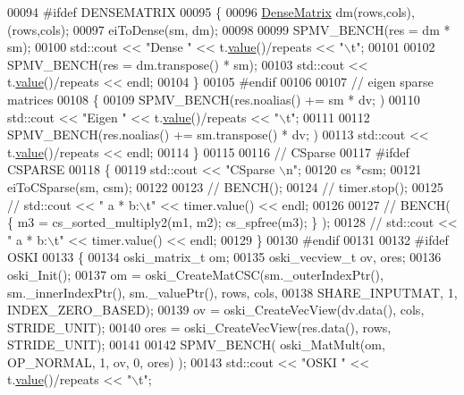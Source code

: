 \begin{DoxyCode}
00094 \textcolor{preprocessor}{    #ifdef DENSEMATRIX}
00095     \{
00096       \hyperlink{group___core___module}{DenseMatrix} dm(rows,cols), (rows,cols);
00097       eiToDense(sm, dm);
00098 
00099       SPMV\_BENCH(res = dm * sm);
00100       std::cout << \textcolor{stringliteral}{"Dense       "} << t.\hyperlink{class_eigen_1_1_bench_timer_a26760f963ed8b64c126159bfea57735e}{value}()/repeats << \textcolor{stringliteral}{"\(\backslash\)t"};
00101 
00102       SPMV\_BENCH(res = dm.transpose() * sm);
00103       std::cout << t.\hyperlink{class_eigen_1_1_bench_timer_a26760f963ed8b64c126159bfea57735e}{value}()/repeats << endl;
00104     \}
00105 \textcolor{preprocessor}{    #endif}
00106 
00107     \textcolor{comment}{// eigen sparse matrices}
00108     \{
00109       SPMV\_BENCH(res.noalias() += sm * dv; )
00110       std::cout << \textcolor{stringliteral}{"Eigen       "} << t.\hyperlink{class_eigen_1_1_bench_timer_a26760f963ed8b64c126159bfea57735e}{value}()/repeats << \textcolor{stringliteral}{"\(\backslash\)t"};
00111 
00112       SPMV\_BENCH(res.noalias() += sm.transpose() * dv; )
00113       std::cout << t.\hyperlink{class_eigen_1_1_bench_timer_a26760f963ed8b64c126159bfea57735e}{value}()/repeats << endl;
00114     \}
00115 
00116     \textcolor{comment}{// CSparse}
00117 \textcolor{preprocessor}{    #ifdef CSPARSE}
00118     \{
00119       std::cout << \textcolor{stringliteral}{"CSparse \(\backslash\)n"};
00120       cs *csm;
00121       eiToCSparse(sm, csm);
00122 
00123 \textcolor{comment}{//       BENCH();}
00124 \textcolor{comment}{//       timer.stop();}
00125 \textcolor{comment}{//       std::cout << "   a * b:\(\backslash\)t" << timer.value() << endl;}
00126 
00127 \textcolor{comment}{//       BENCH( \{ m3 = cs\_sorted\_multiply2(m1, m2); cs\_spfree(m3); \} );}
00128 \textcolor{comment}{//       std::cout << "   a * b:\(\backslash\)t" << timer.value() << endl;}
00129     \}
00130 \textcolor{preprocessor}{    #endif}
00131 
00132 \textcolor{preprocessor}{    #ifdef OSKI}
00133     \{
00134       oski\_matrix\_t om;
00135       oski\_vecview\_t ov, ores;
00136       oski\_Init();
00137       om = oski\_CreateMatCSC(sm.\_outerIndexPtr(), sm.\_innerIndexPtr(), sm.\_valuePtr(), rows, cols,
00138                              SHARE\_INPUTMAT, 1, INDEX\_ZERO\_BASED);
00139       ov = oski\_CreateVecView(dv.data(), cols, STRIDE\_UNIT);
00140       ores = oski\_CreateVecView(res.data(), rows, STRIDE\_UNIT);
00141 
00142       SPMV\_BENCH( oski\_MatMult(om, OP\_NORMAL, 1, ov, 0, ores) );
00143       std::cout << \textcolor{stringliteral}{"OSKI        "} << t.\hyperlink{class_eigen_1_1_bench_timer_a26760f963ed8b64c126159bfea57735e}{value}()/repeats << \textcolor{stringliteral}{"\(\backslash\)t"};

\end{DoxyCode}
